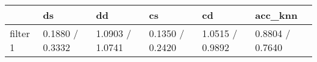 \begin{tabular}{llllll}
\toprule
{} &               ds &               dd &               cs &               cd &          acc\_knn \\
\midrule
filter 1 &  0.1880 / 0.3332 &  1.0903 / 1.0741 &  0.1350 / 0.2420 &  1.0515 / 0.9892 &  0.8804 / 0.7640 \\
\bottomrule
\end{tabular}
